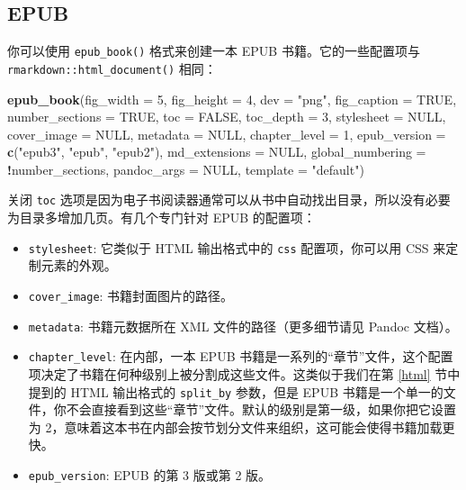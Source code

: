 \documentclass[
  12pt,
]{krantz}
\newenvironment{Shaded}{\begin{snugshade}}{\end{snugshade}}
\newcommand{\AttributeTok}[1]{\textcolor[rgb]{0.13,0.29,0.53}{#1}}
\newcommand{\ConstantTok}[1]{\textcolor[rgb]{0.56,0.35,0.01}{#1}}
\newcommand{\DecValTok}[1]{\textcolor[rgb]{0.00,0.00,0.81}{#1}}
\newcommand{\FunctionTok}[1]{\textcolor[rgb]{0.13,0.29,0.53}{\textbf{#1}}}
\newcommand{\NormalTok}[1]{#1}
\newcommand{\SpecialCharTok}[1]{\textcolor[rgb]{0.81,0.36,0.00}{\textbf{#1}}}
\newcommand{\StringTok}[1]{\textcolor[rgb]{0.31,0.60,0.02}{#1}}
\providecommand{\tightlist}{%
  \setlength{\itemsep}{0pt}\setlength{\parskip}{0pt}}
\theoremstyle{definition}
\theoremstyle{definition}
\theoremstyle{definition}
\theoremstyle{definition}
\theoremstyle{remark}
\begin{document}
\subsection{EPUB}\label{epub}

你可以使用 \texttt{epub\_book()} 格式来创建一本 EPUB 书籍。它的一些配置项与 \texttt{rmarkdown::html\_document()} 相同：

\begin{Shaded}
\begin{Highlighting}[]
\FunctionTok{epub\_book}\NormalTok{(}\AttributeTok{fig\_width =} \DecValTok{5}\NormalTok{, }\AttributeTok{fig\_height =} \DecValTok{4}\NormalTok{, }\AttributeTok{dev =} \StringTok{"png"}\NormalTok{,}
  \AttributeTok{fig\_caption =} \ConstantTok{TRUE}\NormalTok{, }\AttributeTok{number\_sections =} \ConstantTok{TRUE}\NormalTok{,}
  \AttributeTok{toc =} \ConstantTok{FALSE}\NormalTok{, }\AttributeTok{toc\_depth =} \DecValTok{3}\NormalTok{, }\AttributeTok{stylesheet =} \ConstantTok{NULL}\NormalTok{,}
  \AttributeTok{cover\_image =} \ConstantTok{NULL}\NormalTok{, }\AttributeTok{metadata =} \ConstantTok{NULL}\NormalTok{,}
  \AttributeTok{chapter\_level =} \DecValTok{1}\NormalTok{,}
  \AttributeTok{epub\_version =} \FunctionTok{c}\NormalTok{(}\StringTok{"epub3"}\NormalTok{, }\StringTok{"epub"}\NormalTok{, }\StringTok{"epub2"}\NormalTok{),}
  \AttributeTok{md\_extensions =} \ConstantTok{NULL}\NormalTok{,}
  \AttributeTok{global\_numbering =} \SpecialCharTok{!}\NormalTok{number\_sections,}
  \AttributeTok{pandoc\_args =} \ConstantTok{NULL}\NormalTok{, }\AttributeTok{template =} \StringTok{"default"}\NormalTok{)}
\end{Highlighting}
\end{Shaded}

关闭 \texttt{toc} 选项是因为电子书阅读器通常可以从书中自动找出目录，所以没有必要为目录多增加几页。有几个专门针对 EPUB 的配置项：

\begin{itemize}
\tightlist
\item
  \texttt{stylesheet}: 它类似于 HTML 输出格式中的 \texttt{css} 配置项，你可以用 CSS 来定制元素的外观。
\item
  \texttt{cover\_image}: 书籍封面图片的路径。
\item
  \texttt{metadata}: 书籍元数据所在 XML 文件的路径（更多细节请见 Pandoc 文档）。
\item
  \texttt{chapter\_level}: 在内部，一本 EPUB 书籍是一系列的``章节''文件，这个配置项决定了书籍在何种级别上被分割成这些文件。这类似于我们在第 \ref{html} 节中提到的 HTML 输出格式的 \texttt{split\_by} 参数，但是 EPUB 书籍是一个单一的文件，你不会直接看到这些``章节''文件。默认的级别是第一级，如果你把它设置为 2，意味着这本书在内部会按节划分文件来组织，这可能会使得书籍加载更快。
\item
  \texttt{epub\_version}: EPUB 的第 3 版或第 2 版。
\end{itemize}
\end{document}
